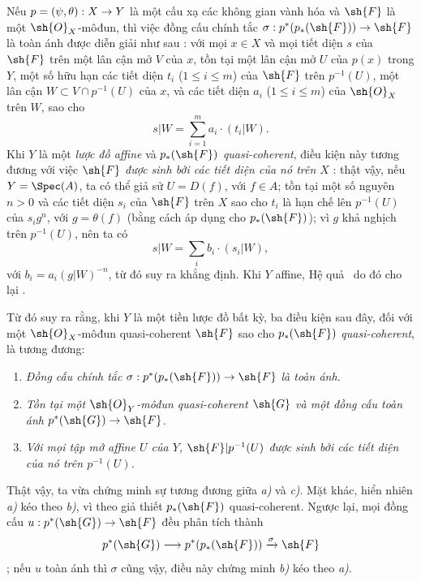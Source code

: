\documentclass[oneside,10pt]{amsart}
\makeatletter
\renewcommand{\leq}{\leqslant}
\newcommand{\ega@arrow}[2]{\mathchoice{#1}{#2}{#2}{#2}}
\renewcommand{\to}{\ega@arrow{\longrightarrow}{\rightarrow}}
\newcommand{\oldpage}[2][]{\marginnote{\normalfont\footnotesize\textbf{#1}~|~#2}\ignorespaces}
\let\EGAOriginalLabel\label
\renewcommand{\label}[1]{\phantomsection\EGAOriginalLabel{#1}}
\makeatother
\begin{document}
\begin{remarks}[3.4.7]
\label{II.3.4.7}
Nếu $p=(\psi,\theta):X\to Y$ là một cấu xạ các không gian vành hóa và $\sh{F}$ là một $\sh{O}_X$-môđun, thì việc đồng cấu chính tắc $\sigma:p^*(p_*(\sh{F}))\to\sh{F}$ là toàn ánh được diễn giải như sau : với mọi $x\in X$ và mọi tiết diện $s$ của $\sh{F}$ trên một lân cận mở $V$ của $x$, tồn tại một lân cận mở $U$ của $p(x)$ trong $Y$, một số hữu hạn các tiết diện $t_i$ ($1\leq i\leq m$) của $\sh{F}$ trên $p^{-1}(U)$, một lân cận $W\subset V\cap p^{-1}(U)$ của $x$, và các tiết diện $a_i$ ($1\leq i\leq m$) của $\sh{O}_X$ trên $W$, sao cho
\[
  s|W=\sum_{i=1}^m a_i\cdot(t_i|W).
\]
Khi $Y$ là một \emph{lược đồ affine} và $p_*(\sh{F})$ \emph{quasi-coherent}, điều kiện này tương đương với việc $\sh{F}$ \emph{được sinh bởi các tiết diện của nó trên $X$} : thật vậy, nếu $Y=\Spec(A)$, ta có thể giả sử $U=D(f)$, với $f\in A$;
tồn tại một số nguyên $n>0$ và các tiết diện $s_i$ của $\sh{F}$ trên $X$ sao cho $t_i$ là hạn chế lên $p^{-1}(U)$ của $s_ig^n$, với $g=\theta(f)$ (bằng cách áp dụng  cho $p_*(\sh{F})$);
vì $g$ khả nghịch trên $p^{-1}(U)$, nên ta có
\[
  s|W=\sum_i b_i\cdot(s_i|W),
\]
với $b_i=a_i(g|W)^{-n}$, từ đó suy ra khẳng định.
Khi $Y$ affine, Hệ quả~ do đó cho lại .

Từ đó suy ra rằng, khi $Y$ là một tiền lược đồ bất kỳ, ba điều kiện
\oldpage[II]{61}
sau đây, đối với một $\sh{O}_X$-môđun quasi-coherent $\sh{F}$ sao cho $p_*(\sh{F})$ \emph{quasi-coherent}, là tương đương:
\begin{enumerate}
  \item[a)] \emph{Đồng cấu chính tắc $\sigma:p^*(p_*(\sh{F}))\to\sh{F}$ là toàn ánh.}
  \item[b)] \emph{Tồn tại một $\sh{O}_Y$-môđun quasi-coherent $\sh{G}$ và một đồng cấu toàn ánh $p^*(\sh{G})\to\sh{F}$.}
  \item[c)] \emph{Với mọi tập mở affine $U$ của $Y$, $\sh{F}|p^{-1}(U)$ được sinh bởi các tiết diện của nó trên $p^{-1}(U)$.}
\end{enumerate}

Thật vậy, ta vừa chứng minh sự tương đương giữa \emph{a)} và \emph{c)}.
Mặt khác, hiển nhiên \emph{a)} kéo theo \emph{b)}, vì theo giả thiết $p_*(\sh{F})$ quasi-coherent.
Ngược lại, mọi đồng cấu $u:p^*(\sh{G})\to\sh{F}$ đều phân tích thành
\[
  p^*(\sh{G})\to p^*(p_*(\sh{F}))\xrightarrow{\sigma}\sh{F}
\]
; nếu $u$ toàn ánh thì $\sigma$ cũng vậy, điều này chứng minh \emph{b)} kéo theo \emph{a)}.
\end{remarks}
\end{document}
